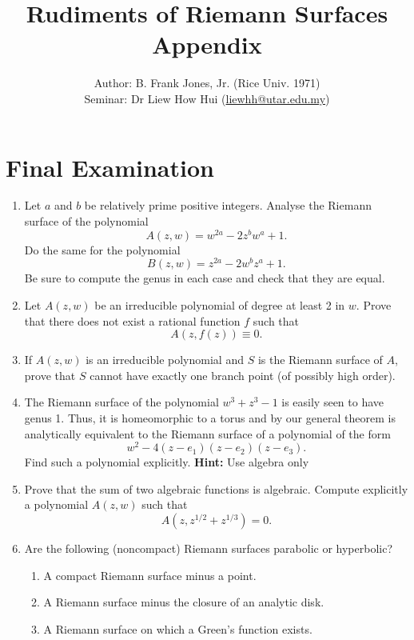 \documentclass[a4paper,11pt]{article}
\begin{document}
\title{{\sc Rudiments of Riemann Surfaces\\
    Appendix}}
\author{Author: B. Frank Jones, Jr. (Rice Univ. 1971)\\
Seminar: Dr Liew How Hui (\url{liewhh@utar.edu.my})}
\date{}

\maketitle

\section{Final Examination}

\begin{enumerate}
\item Let $a$ and $b$ be relatively prime positive integers.  Analyse
  the Riemann surface of the polynomial
  $$
  A(z,w) = w^{2a} - 2z^b w^a + 1.
  $$
  Do the same for the polynomial
  $$
  B(z,w) = z^{2a} - 2w^b z^a + 1.
  $$
  Be sure to compute the genus in each case and check that they are
  equal.

\item Let $A(z,w)$ be an irreducible polynomial of degree at least 2
  in $w$.  Prove that there does not exist a rational function $f$
  such that
  $$
  A(z, f(z)) \equiv 0.
  $$

\item If $A(z,w)$ is an irreducible polynomial and $S$ is the Riemann
  surface of $A$, prove that $S$ cannot have exactly one branch point
  (of possibly high order).

\item The Riemann surface of the polynomial $w^3 + z^3 - 1$ is easily
  seen to have genus 1.  Thus, it is homeomorphic to a torus and by
  our general theorem is analytically equivalent to the Riemann
  surface of a polynomial of the form
  $$
  w^2 - 4(z-e_1)(z-e_2)(z-e_3).
  $$
  Find such a polynomial explicitly. \textbf{Hint:} Use algebra only

\item Prove that the sum of two algebraic functions is algebraic.
  Compute explicitly a polynomial $A(z,w)$ such that
  $$
  A(z, z^{1/2} + z^{1/3}) = 0.
  $$

\item Are the following (noncompact) Riemann surfaces parabolic or
  hyperbolic?
  \begin{enumerate}
  \item A compact Riemann surface minus a point.
  \item A Riemann surface minus the closure of an analytic disk.
  \item A Riemann surface on which a Green's function exists.
  \end{enumerate}
\end{enumerate}
\end{document}

